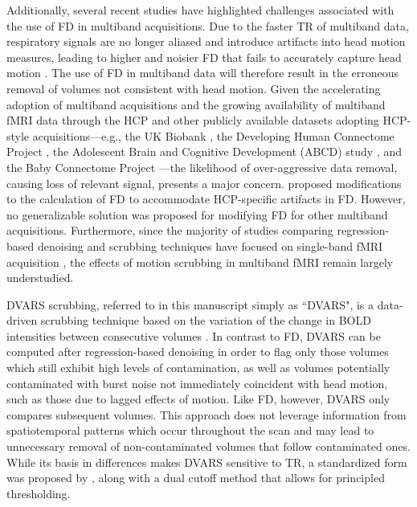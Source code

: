 \documentclass{article}
\begin{document}
Additionally, several recent studies have highlighted challenges associated with the use of FD in multiband acquisitions. Due to the faster TR of multiband data, respiratory signals are no longer aliased and introduce artifacts into head motion measures, leading to higher and noisier FD that fails to accurately capture head motion \citep{fairCorrectionRespiratoryArtifacts2020, grattonRemovalHighFrequency2020}. The use of FD in multiband data will therefore result in the erroneous removal of volumes not consistent with head motion. Given the accelerating adoption of multiband acquisitions and the growing availability of multiband fMRI data through the HCP and other publicly available datasets adopting HCP-style acquisitions---e.g., the UK Biobank \citep{miller2016multimodal}, the Developing Human Connectome Project \citep{hughes2017dedicated}, the Adolescent Brain and Cognitive Development (ABCD) study \citep{casey2018adolescent}, and the Baby Connectome Project \citep{howell2019unc}---the likelihood of over-aggressive data removal, causing loss of relevant signal, presents a major concern.
\cite{power2019distinctions} proposed modifications to the calculation of FD to accommodate HCP-specific artifacts in FD. However, no generalizable solution was proposed for modifying FD for other multiband acquisitions. Furthermore, since the majority of studies comparing regression-based denoising and scrubbing techniques have focused on single-band fMRI acquisition \citep{ciricBenchmarkingParticipantlevelConfound2017, parkesEvaluationEfficacyReliability2018}, the effects of motion scrubbing in multiband fMRI remain largely understudied.  

DVARS scrubbing, referred to in this manuscript simply as ``DVARS", is a data-driven scrubbing technique based on the variation of the change in BOLD intensities between consecutive volumes \citep{smyserLongitudinalAnalysisNeural2010}. In contrast to FD, DVARS can be computed after regression-based denoising in order to flag only those volumes which still exhibit high levels of contamination, as well as volumes potentially contaminated with burst noise not immediately coincident with head motion, such as those due to lagged effects of motion. Like FD, however, DVARS only compares subsequent volumes. This approach does not leverage information from spatiotemporal patterns which occur throughout the scan and may lead to unnecessary removal of non-contaminated volumes that follow contaminated ones. While its basis in differences makes DVARS sensitive to TR, a standardized form was proposed by \cite{afyouniInsightInferenceDVARS2018}, along with a dual cutoff method that allows for principled thresholding. 
\end{document}
